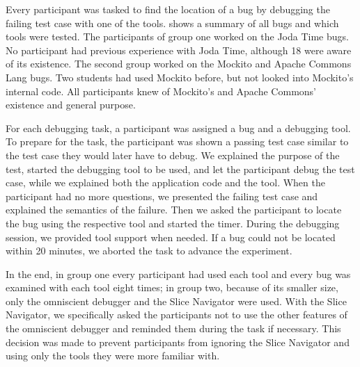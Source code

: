 \documentclass[
			english,
			]{elsarticle}
\begin{document}
Every participant was tasked to find the location of a bug by debugging the failing test case with one of the tools.
 shows a summary of all bugs and which tools were tested.
The participants of group one worked on the Joda Time bugs.
No participant had previous experience with Joda Time, although 18 were aware of its existence.
The second group worked on the Mockito and Apache Commons Lang bugs.
Two students had used Mockito before, but not looked into Mockito's internal code.
All participants knew of Mockito's and Apache Commons' existence and general purpose.

For each debugging task, a participant was assigned a bug and a debugging tool.
To prepare for the task, the participant was shown a passing test case similar to the test case they would later have to debug.
We explained the purpose of the test, started the debugging tool to be used,
and let the participant debug the test case, while we explained both the application code and the tool.
When the participant had no more questions, we presented the failing test case and explained the semantics of the failure.
Then we asked the participant to locate the bug using the respective tool and started the timer.
During the debugging session, we provided tool support when needed.
If a bug could not be located within 20 minutes, we aborted the task to advance the experiment.

In the end, in group one every participant had used each tool and every bug was examined with each tool eight times; in group two, because of its smaller size, only the omniscient debugger and the Slice Navigator were used.
With the Slice Navigator, we specifically asked the participants not to use the other features of the omniscient debugger and reminded them during the task if necessary.
This decision was made to prevent participants from ignoring the Slice Navigator and using only the tools they were more familiar with.

\end{document}
